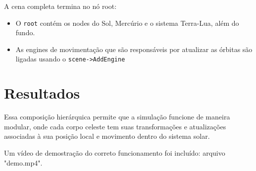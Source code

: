 \documentclass[11pt, a4paper]{article}
\begin{document}
A cena completa termina no nó root:

\begin{itemize}
\item O \texttt{root} contém os nodes do Sol, Mercúrio e o sistema Terra-Lua, além 
do fundo.
\item As engines de movimentação que são responsáveis por atualizar as órbitas 
são ligadas usando o \texttt{scene->AddEngine}
\end{itemize}

\section {Resultados}

Essa composição hierárquica permite que a simulação funcione de maneira modular, 
onde cada corpo celeste tem suas transformações e atualizações associadas à sua 
posição local e movimento dentro do sistema solar.

Um vídeo de demostração do correto funcionamento foi incluído: arquivo "demo.mp4".
\end{document}

